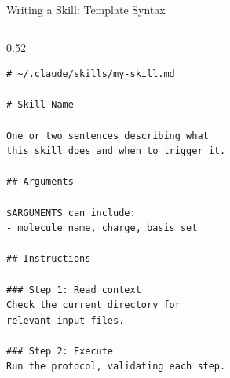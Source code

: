 \documentclass[aspectratio=169, 10pt]{beamer}
\begin{document}
\begin{frame}[fragile]{Writing a Skill: Template Syntax}
  \begin{columns}[T]
    \begin{column}{0.52\textwidth}
\begin{lstlisting}
# ~/.claude/skills/my-skill.md

# Skill Name

One or two sentences describing what
this skill does and when to trigger it.

## Arguments

$ARGUMENTS can include:
- molecule name, charge, basis set

## Instructions

### Step 1: Read context
Check the current directory for
relevant input files.

### Step 2: Execute
Run the protocol, validating each step.


\end{lstlisting}
\end{column}
\end{columns}
\end{frame}
\end{document}
